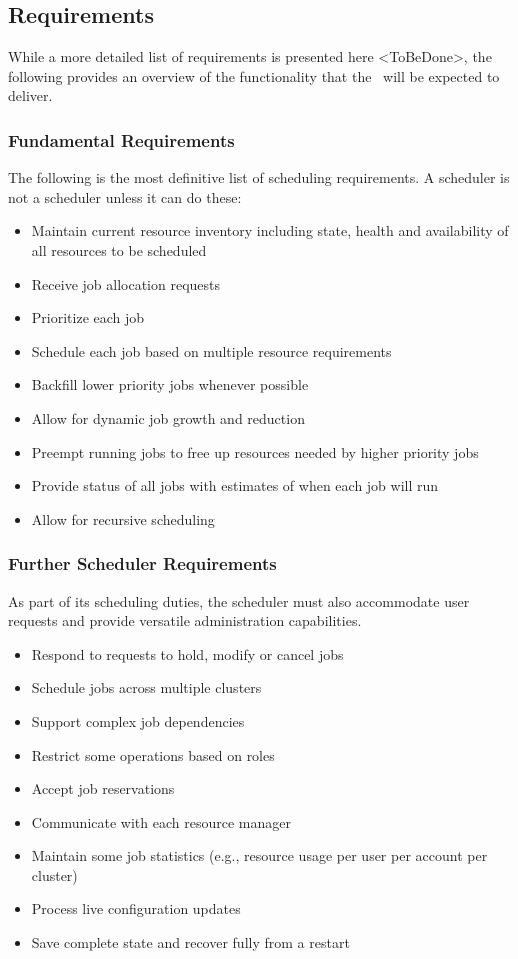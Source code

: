 \subsection{Requirements}

While a more detailed list of requirements is presented here
<ToBeDone>, the following provides an overview of the functionality
that the \ngjs\ will be expected to deliver.

\subsubsection{Fundamental Requirements}

The following is the most definitive list of scheduling requirements.
A scheduler is not a scheduler unless it can do these:

\begin{itemize}
  \item Maintain current resource inventory including state, health
    and availability of all resources to be scheduled
  \item Receive job allocation requests
  \item Prioritize each job
  \item Schedule each job based on multiple resource requirements
  \item Backfill lower priority jobs whenever possible
  \item Allow for dynamic job growth and reduction
  \item Preempt running jobs to free up resources needed by higher priority jobs
  \item Provide status of all jobs with estimates of when each job will run
  \item Allow for recursive scheduling
\end{itemize}

\subsubsection{Further Scheduler Requirements}

As part of its scheduling duties, the scheduler must also accommodate
user requests and provide versatile administration capabilities.

\begin{itemize}
  \item Respond to requests to hold, modify or cancel jobs
  \item Schedule jobs across multiple clusters
  \item Support complex job dependencies
  \item Restrict some operations based on roles
  \item Accept job reservations
  \item Communicate with each resource manager
  \item Maintain some job statistics (e.g., resource usage per user
    per account per cluster)
  \item Process live configuration updates
  \item Save complete state and recover fully from a restart
\end{itemize}

